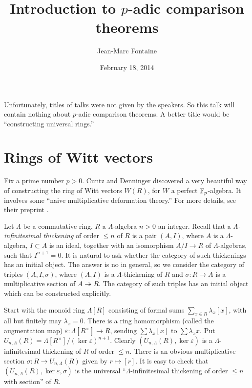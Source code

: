 \documentclass{article}
\title{Introduction to $p$-adic comparison theorems}
\author{Jean-Marc Fontaine}
\date{February 18, 2014}
\begin{document}
\maketitle





Unfortunately, titles of talks were not given by the speakers. So this talk 
will contain nothing about $p$-adic comparison theorems. A better title would 
be ``constructing universal rings.'' 





\section{Rings of Witt vectors}

Fix a prime number $p>0$. Cuntz and Denninger discovered a very beautiful 
way of constructing the ring of Witt vectors $W(R)$, for $W$ a perfect 
$\mathbb{F}_p$-algebra. It involves some ``naive multiplicative deformation theory.'' 
For more details, see their preprint \cite{cd13}. 

Let $\Lambda$ be a commutative ring, $R$ a $\Lambda$-algebra $n>0$ an integer. 
Recall that a \emph{$\Lambda$-infinitesimal thickening} of order 
$\leqslant n$ of $R$ is a pair $(A,I)$, where $A$ is a $\Lambda$-algebra, 
$I\subset A$ is an ideal, together with an isomorphism $A/I\to R$ of 
$\Lambda$-algebras, such that $I^{n+1}=0$. It is natural to ask whether the 
category of such thickenings has an initial object. The answer is no in 
general, so we consider the category of triples $(A,I,\sigma)$, where 
$(A,I)$ is a $\Lambda$-thickening of $R$ and $\sigma:R\to A$ is a 
multiplicative section of $A\twoheadrightarrow R$. The category of such triples 
has an initial object which can be constructed explicitly. 

Start with the monoid ring $\Lambda[R]$ consisting of formal sums 
$\sum_{x\in R} \lambda_x [x]$, with all but finitely may $\lambda_x=0$. 
There is a ring homomorphism (called the augmentation map) 
$\varepsilon:\Lambda[R^\times] \to R$, sending $\sum \lambda_x [x]$ to 
$\sum \lambda_x x$. Put 
$U_{n,\Lambda}(R) = \Lambda[R^\times]/(\ker\varepsilon)^{n+1}$. Clearly 
$(U_{n,\Lambda}(R),\ker\varepsilon)$ is a $\Lambda$-infinitesimal thickening of 
$R$ of order $\leqslant n$. There is an obvious multiplicative section 
$\sigma:R\to U_{n,\Lambda}(R)$ given by $r\mapsto [r]$. It is easy to check 
that $(U_{n,\Lambda}(R),\ker\varepsilon,\sigma)$ is the universal 
``$\Lambda$-infinitesimal thickening of order $\leqslant n$ with section'' of 
$R$. 
\end{document}
